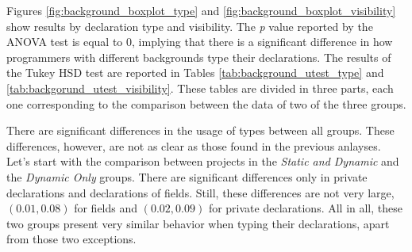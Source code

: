 \documentclass[msc]{ppgccufmg}
\begin{document}
Figures \ref{fig:background_boxplot_type} and \ref{fig:background_boxplot_visibility}  show results by declaration type and visibility.
The \emph{p} value reported by the ANOVA test is equal to 0, implying that there is a significant difference in how programmers with different backgrounds type their declarations.
The results of the Tukey HSD test are reported in Tables \ref{tab:background_utest_type} and \ref{tab:backgorund_utest_visibility}.
These tables are divided in three parts, each one corresponding to the comparison between the data of two of the three groups.

There are significant differences in the usage of types between all groups.
These differences, however, are not as clear as those found in the previous anlayses.
Let's start with the comparison between projects in the \emph{Static and Dynamic} and the \emph{Dynamic Only} groups.
There are significant differences only in private declarations and declarations of fields.
Still, these differences are not very large, $(0.01,0.08)$ for fields and $(0.02,0.09)$ for private declarations.
All in all, these two groups present very similar behavior when typing their declarations, apart from those two exceptions.
\end{document}
